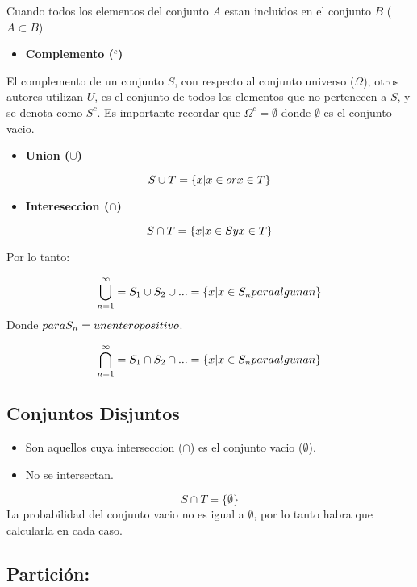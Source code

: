 \documentclass[]{book}
\providecommand{\tightlist}{%
  \setlength{\itemsep}{0pt}\setlength{\parskip}{0pt}}
\begin{document}
Cuando todos los elementos del conjunto \(A\) estan incluidos en el
conjunto \(B\) (\(A \subset B\))

\begin{itemize}
\tightlist
\item
  \textbf{Complemento (\(^c\))}
\end{itemize}

El complemento de un conjunto \(S\), con respecto al conjunto universo
(\(\Omega\)), otros autores utilizan \(U\), es el conjunto de todos los
elementos que no pertenecen a \(S\), y se denota como \(S^c\). Es
importante recordar que \(\Omega^c = \emptyset\) donde \(\emptyset\) es
el conjunto vacio.

\begin{itemize}
\tightlist
\item
  \textbf{Union (\(\cup\))}
\end{itemize}

\[S \cup T = \{x|x \in or\space x\in T\}\]

\begin{itemize}
\tightlist
\item
  \textbf{Intereseccion (\(\cap\))}
\end{itemize}

\[S \cap T = \{x|x \in S\space y \space x \in T \} \]

 Por lo tanto:

\[\bigcup_{n=1}^{\infty}= S_1 \cup S_2 \cup ...= \{ x|x \in S_n para \space alguna\space n\} \]
Donde \(para\space S_n = \space un \space entero \space positivo\).

\[ \bigcap_{n=1}^{\infty} = S_1 \cap S_2 \cap ... = \{ x|x \in S_n \space para \space alguna \space n\}\]

\subsection{Conjuntos Disjuntos}\label{conjuntos-disjuntos-1}

\begin{itemize}
\tightlist
\item
  Son aquellos cuya interseccion (\(\cap\)) es el conjunto vacio
  (\(\emptyset\)).
\item
  No se intersectan.
\end{itemize}

\[S \cap T = \{ \emptyset\}\] La probabilidad del conjunto vacio no es
igual a \(\emptyset\), por lo tanto habra que calcularla en cada caso.

\subsection{Partición:}\label{particion-1}
\end{document}
